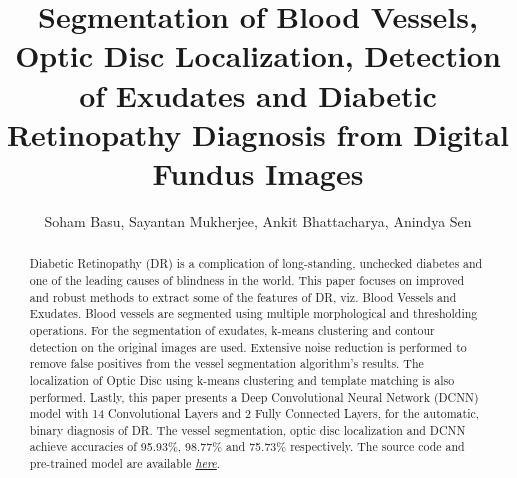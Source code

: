 \documentclass{svproc}
\begin{document}
\mainmatter              \title{Segmentation of Blood Vessels, Optic Disc Localization, Detection of Exudates and Diabetic Retinopathy Diagnosis from Digital Fundus Images}



\author{Soham Basu, Sayantan Mukherjee, Ankit Bhattacharya, 
Anindya Sen}

\maketitle              

\begin{abstract}
Diabetic Retinopathy (DR) is a complication of long-standing, unchecked diabetes and one of the leading causes of blindness in the world. This paper focuses on improved and robust methods to extract some of the features of DR, viz. Blood Vessels and Exudates. Blood vessels are segmented using multiple morphological and thresholding operations. For the segmentation of exudates, k-means clustering and contour detection on the original images are used. Extensive noise reduction is performed to remove false positives from the vessel segmentation algorithm’s results. The localization of Optic Disc using k-means clustering and template matching is also performed. Lastly, this paper presents a Deep Convolutional Neural Network (DCNN) model with 14 Convolutional Layers and 2 Fully Connected Layers, for the automatic, binary diagnosis of DR. The vessel segmentation, optic disc localization and DCNN achieve accuracies of 95.93\%, 98.77\% and 75.73\% respectively. The source code and pre-trained model are available \textcolor{blue}{\href{https://github.com/Sohambasu07/DR_2021}{\textit{here}}}. 


\end{abstract}
\end{document}
